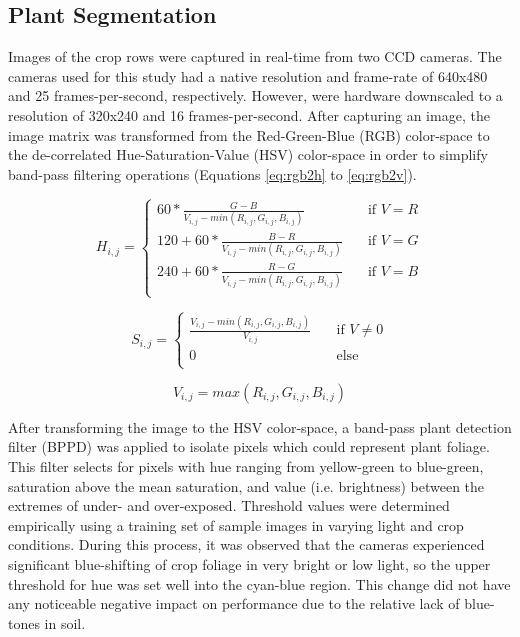 \documentclass[authoryear]{elsarticle}
\begin{document}
\subsection{Plant Segmentation}
Images of the crop rows were captured in real-time from two CCD
cameras. The cameras used for this study had a native resolution and
frame-rate of 640x480 and 25 frames-per-second, respectively. However, 
were hardware downscaled to a resolution of 320x240 and 16
frames-per-second. After capturing an image, the image matrix was
transformed from the Red-Green-Blue (RGB) color-space to the
de-correlated Hue-Saturation-Value (HSV) color-space in order to
simplify band-pass filtering operations (Equations \ref{eq:rgb2h} to
\ref{eq:rgb2v}).

\begin{equation}
  H_{i,j} =
  \begin{cases}
    60 * \frac{G-B}{V_{i,j}-min(R_{i,j},G_{i,j},B_{i,j})} & \quad \text{if } V = R \\
    120 + 60 * \frac{B-R}{V_{i,j}-min(R_{i,j},G_{i,j},B_{i,j})} & \quad \text{if } V = G \\
    240 + 60 * \frac{R-G}{V_{i,j}-min(R_{i,j},G_{i,j},B_{i,j})} & \quad \text{if } V = B \\
  \end{cases}
  \label{eq:rgb2h}
\end{equation}

\begin{equation}
  S_{i,j} = 
  \begin{cases}
    \frac{V_{i,j}-min(R_{i,j},G_{i,j},B_{i,j})}{V_{i,j}}  & \quad \text{if } V \neq 0 \\
    0  & \quad \text{else}\\
  \end{cases}
  \label{eq:rgb2s}
\end{equation}

\begin{equation}
  V_{i,j} = max(R_{i,j},G_{i,j},B_{i,j})
  \label{eq:rgb2v}
\end{equation}

After transforming the image to the HSV color-space, a band-pass plant
detection filter (BPPD) was applied to isolate pixels which could
represent plant foliage. This filter selects for pixels with hue
ranging from yellow-green to blue-green, saturation above the mean
saturation, and value (i.e. brightness) between the extremes of under-
and over-exposed. Threshold values were determined empirically using a
training set of sample images in varying light and crop
conditions. During this process, it was observed that the cameras
experienced significant blue-shifting of crop foliage in very bright
or low light, so the upper threshold for hue was set well into the
cyan-blue region. This change did not have any noticeable negative
impact on performance due to the relative lack of blue-tones in soil.
\end{document}
